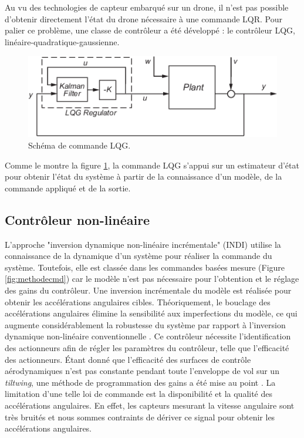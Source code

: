 {\color{blue}
    Au vu des technologies de capteur embarqué sur un drone, il n'est pas possible d'obtenir directement l'état du drone nécessaire à une commande LQR. Pour palier ce problème, une classe de contrôleur a été développé : le contrôleur LQG, linéaire-quadratique-gaussienne. 
    \begin{figure}[H]
        \centerline{
        \includegraphics[trim=0cm 0cm 0cm 0cm,clip,width=0.6\columnwidth]{figures/regulator.png}}
        \caption{Schéma de commande LQG.}
        \label{fig:LQG}
    \end{figure}

    Comme le montre la figure \ref{fig:LQG}, la commande LQG s'appui sur un estimateur d'état pour obtenir l'état du système à partir de la connaissance d'un modèle, de la commande appliqué et de la sortie. 
}


\subsection*{Contrôleur non-linéaire}
{\color{blue}
L'approche "inversion dynamique non-linéaire incrémentale" (INDI) utilise la connaissance de la dynamique d'un système pour réaliser la commande du système. Toutefois, elle est classée dans les commandes basées mesure (Figure \ref{fig:methodecmd}) car le modèle n'est pas nécessaire pour l'obtention et le réglage des gains du contrôleur. Une inversion incrémentale du modèle est réalisée pour obtenir les accélérations angulaires cibles. Théoriquement, le bouclage des accélérations angulaires élimine la sensibilité aux imperfections du modèle, ce qui augmente considérablement la robustesse du système par rapport à l'inversion dynamique non-linéaire conventionnelle \cite{Sieberling2010, Binz2019}. Ce contrôleur nécessite l'identification des actionneurs afin de régler les paramètres du contrôleur, telle que l'efficacité des actionneurs. Étant donné que l'efficacité des surfaces de contrôle aérodynamiques n'est pas constante pendant toute l'enveloppe de vol sur un \textit{tiltwing}, une méthode de programmation des gains a été mise au point \cite{smeurINDI,smeurINDITail}.
La limitation d'une telle loi de commande est la disponibilité et la qualité  des accélérations angulaires. En effet, les capteurs mesurant la vitesse angulaire sont très bruités et nous sommes contraints de dériver ce signal pour obtenir les accélérations angulaires.
}


